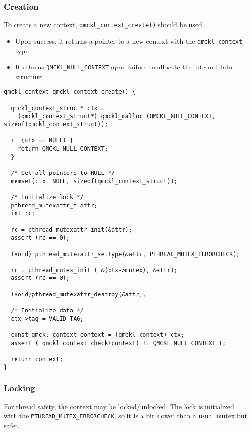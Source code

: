 \subsubsection{Creation}
\label{sec:orgd8b711a}

To create a new context, \texttt{qmckl\_context\_create()} should be used.
\begin{itemize}
\item Upon success, it returns a pointer to a new context with the \texttt{qmckl\_context} type
\item It returns \texttt{QMCKL\_NULL\_CONTEXT} upon failure to allocate the internal data structure
\end{itemize}

\begin{verbatim}
qmckl_context qmckl_context_create() {

  qmckl_context_struct* ctx =
    (qmckl_context_struct*) qmckl_malloc (QMCKL_NULL_CONTEXT, sizeof(qmckl_context_struct));

  if (ctx == NULL) {
    return QMCKL_NULL_CONTEXT;
  }

  /* Set all pointers to NULL */
  memset(ctx, NULL, sizeof(qmckl_context_struct));

  /* Initialize lock */
  pthread_mutexattr_t attr;
  int rc;

  rc = pthread_mutexattr_init(&attr); 
  assert (rc == 0);

  (void) pthread_mutexattr_settype(&attr, PTHREAD_MUTEX_ERRORCHECK);

  rc = pthread_mutex_init ( &(ctx->mutex), &attr);
  assert (rc == 0);

  (void)pthread_mutexattr_destroy(&attr);

  /* Initialize data */
  ctx->tag = VALID_TAG;

  const qmckl_context context = (qmckl_context) ctx;
  assert ( qmckl_context_check(context) != QMCKL_NULL_CONTEXT );

  return context;
}
\end{verbatim}
\subsubsection{Locking}
\label{sec:orge3ea316}

For thread safety, the context may be locked/unlocked. The lock is
initialized with the \texttt{PTHREAD\_MUTEX\_ERRORCHECK}, so it is a bit
slower than a usual mutex but safer.

